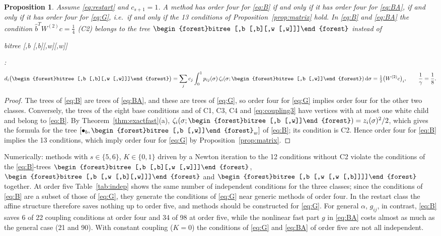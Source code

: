 \documentclass[11pt,a4paper]{article}
\newtheorem{proposition}[theorem]{Proposition}
\theoremstyle{definition}
\theoremstyle{remark}
\newcommand{\dd}{\,\mathrm{d}}
\newcommand{\btree}[1]{\begin{forest}bitree #1\end{forest}}
\newcommand{\Tbw}{\btree{[,b [,w]]}}
\newcommand{\Tfourbww}{\btree{[,b [,b][,w][,w]]}}
\begin{document}
\begin{proposition}\label{prop:affine}
Assume \eqref{eq:restart} and $c_{s+1}=1$. A method has order four for \eqref{eq:B} if and only if it has order four
for \eqref{eq:BA}, if and only if it has order four for \eqref{eq:G}, i.e.\ if and only if the 13 conditions of
Proposition~\ref{prop:matrix} hold. In \eqref{eq:B} and \eqref{eq:BA} the condition $\hat b^TW^{(2)}c=\frac14$ (C2)
belongs to the tree $\btree{[,b [,b][,w [,w]]]}$ instead of \Tfourbww:
\[
 d_i\big(\btree{[,b [,b][,w [,w]]]}\big)=\sum_jc_j\int_0^1p_{ij}(\sigma)\,\zeta_i(\sigma;\Tbw)\dd\sigma
 =\tfrac12\big(W^{(2)}c\big)_i,\qquad \frac1{\gamma}=\frac18.
\]
\end{proposition}

\begin{proof}
The trees of \eqref{eq:B} are trees of \eqref{eq:BA}, and these are trees of \eqref{eq:G}, so order four for \eqref{eq:G}
implies order four for the other two classes. Conversely, the trees of the eight base conditions and of C1, C3, C4 and
\eqref{eq:coupling3} have vertices with at most one white child and belong to \eqref{eq:B}. By
Theorem~\ref{thm:exactfast}(a), $\zeta_i(\sigma;\Tbw)=z_i(\sigma)^2/2$, which gives the formula for the tree
$[\bullet_b,\Tbw_w]$ of \eqref{eq:B}; its condition is C2. Hence order four for \eqref{eq:B} implies the 13 conditions,
which imply order four for \eqref{eq:G} by Proposition~\ref{prop:matrix}.
\end{proof}

Numerically: methods with $s\in\{5,6\}$, $K\in\{0,1\}$ driven by a Newton iteration to the 12 conditions without C2
violate the conditions of the \eqref{eq:B}-trees $\btree{[,b [,b][,w [,w]]]}$, $\btree{[,b [,w [,b][,w]]]}$ and
$\btree{[,b [,w [,w [,b]]]]}$ together. At order five Table~\ref{tab:indep} shows the same number of independent
conditions for the three classes; since the conditions of \eqref{eq:B} are a subset of those of \eqref{eq:G}, they
generate the conditions of \eqref{eq:G} near generic methods of order four. In the restart class the affine structure
therefore saves nothing up to order five, and methods should be constructed for \eqref{eq:G}. For general $\alpha$,
$g_{ij}$, in contrast, \eqref{eq:B} saves 6 of 22 coupling conditions at order four and 34 of 98 at order five, while
the nonlinear fast part $g$ in \eqref{eq:BA} costs almost as much as the general case (21 and 90). With constant
coupling ($K=0$) the conditions of \eqref{eq:G} and \eqref{eq:BA} of order five are not all independent.
\end{document}

